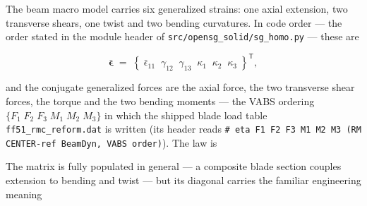 The beam macro model carries six generalized strains: one axial extension, two
transverse shears, one twist and two bending curvatures. In code order --- the
order stated in the module header of \texttt{src/opensg\_solid/sg\_homo.py} ---
these are

\begin{equation}
\bar{\boldsymbol\epsilon} \;=\;
\left\{\;\bar\epsilon_{11}\;\;\gamma_{12}\;\;\gamma_{13}\;\;
\kappa_{1}\;\;\kappa_{2}\;\;\kappa_{3}\;\right\}^{\mathsf T},
\end{equation}

and the conjugate generalized forces are the axial force, the two transverse
shear forces, the torque and the two bending moments --- the VABS ordering
$\{F_1\;F_2\;F_3\;M_1\;M_2\;M_3\}$ in which the shipped blade load table
\texttt{ff51\_rmc\_reform.dat} is written (its header reads
\verb|# eta F1 F2 F3 M1 M2 M3 (RM CENTER-ref BeamDyn, VABS order)|). The law is


The matrix is fully populated in general --- a composite blade section couples
extension to bending and twist --- but its diagonal carries the familiar
engineering meaning

